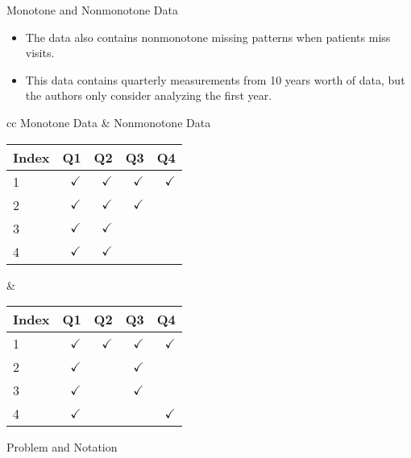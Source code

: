 \documentclass{beamer} %
\begin{document}
\begin{frame}{Monotone and Nonmonotone Data}
  \begin{itemize}
    \item The data also contains nonmonotone missing patterns when patients miss visits.
    \item This data contains quarterly measurements from 10 years worth of data,
      but the authors only consider analyzing the first year.
  \end{itemize}

  \vspace{0.5cm}

  \begin{center}
  {\footnotesize
  \begin{tabular}{cc}
    Monotone Data & Nonmonotone Data \\
    \begin{tabular}{lrrrr}
      \toprule
      Index &  Q1 & Q2 & Q3 & Q4 \\
      \midrule
      1 & $\checkmark$ & $\checkmark$ & $\checkmark$ & $\checkmark$ \\ 
      2 & $\checkmark$ & $\checkmark$ & $\checkmark$ &\\ 
      3 & $\checkmark$ & $\checkmark$ & & \\ 
      4 & $\checkmark$ & $\checkmark$ & & \\ 
      \bottomrule
    \end{tabular} &
    \begin{tabular}{lrrrr}
      \toprule
      Index & Q1 & Q2 & Q3 & Q4\\
      \midrule
      1 & $\checkmark$ & $\checkmark$ & $\checkmark$ & $\checkmark$ \\ 
      2 & $\checkmark$ &  & $\checkmark$ & \\ 
      3 & $\checkmark$ & & $\checkmark$ & \\ 
      4 & $\checkmark$ & & & $\checkmark$ \\ 
      \bottomrule
    \end{tabular}
  \end{tabular}
  }
  \end{center}
\end{frame}

\begin{frame}

  \begin{center}
    \Large
    Problem and Notation
  \end{center}

\end{frame}
\end{document}
